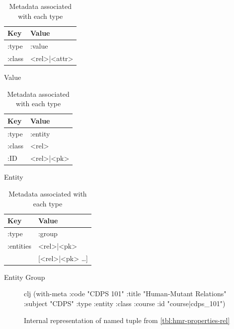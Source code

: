 			\begin{table}
				\begin{subtable}[b]{0.33\linewidth}
					\centering
					
					\begin{tabular}{ll}
						\toprule
						Key & Value \\
						\midrule
						:type & :value \\
						:class & <rel>|<attr> \\
						\bottomrule
					\end{tabular}
					
					\caption{Value}
				\end{subtable}
				\begin{subtable}[b]{0.33\linewidth}
					\centering
					
					\begin{tabular}{ll}
						\toprule
						Key & Value \\
						\midrule
						:type & :entity \\
						:class & <rel> \\
						:ID & <rel>|<pk> \\
						\bottomrule
					\end{tabular}
					
					\caption{Entity}
				\end{subtable}
				\begin{subtable}[b]{0.33\linewidth}
					\centering
					
					\begin{tabular}{ll}
						\toprule
						Key & Value \\
						\midrule
						:type & :group \\
						:entities & <rel>|<pk> \\
						 & [<rel>|<pk> \ldots] \\
						\bottomrule
					\end{tabular}
					
					\caption{Entity Group}
				\end{subtable}
				
				\caption{Metadata associated with each type}
				\label{tbl:type-metadata}
			\end{table}
			
			\begin{figure}
				\begin{singlespaced}
					\begin{pygments}{clj}
(with-meta
  {:code    "CDPS 101"
   :title   "Human-Mutant Relations"
   :subject "CDPS"}
  {:type  :entity
   :class :course
   :id    "course|cdps_101"})
					\end{pygments}
				\end{singlespaced}
				
				\caption{Internal representation of named tuple from \cref{tbl:hmr-properties-rel}}
				\label{clj:with-meta-internal-rep}
			\end{figure}
			
